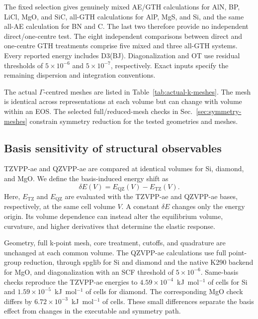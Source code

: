 \documentclass[10pt,a4paper]{article}
\begin{document}
The fixed selection gives genuinely mixed AE/GTH calculations for AlN, BP, LiCl, MgO, and SiC, all-GTH calculations for AlP, MgS, and Si, and the same all-AE calculation for BN and C. The last two therefore provide no independent direct/one-centre test. The eight independent comparisons between direct and one-centre GTH treatments comprise five mixed and three all-GTH systems. Every reported energy includes D3(BJ). Diagonalization and OT use residual thresholds of $5\times10^{-6}$ and $5\times10^{-7}$, respectively. Exact inputs specify the remaining dispersion and integration conventions.

The actual $\Gamma$-centred meshes are listed in Table~\ref{tab:actual-k-meshes}. The mesh is identical across representations at each volume but can change with volume within an EOS. The selected full/reduced-mesh checks in Sec.~\ref{sec:symmetry-meshes} constrain symmetry reduction for the tested geometries and meshes.


\subsection{Basis sensitivity of structural observables}
\label{sec:solid-basis}

TZVPP-ae and QZVPP-ae are compared at identical volumes for Si, diamond, and MgO. We define the basis-induced energy shift as
\begin{equation}
 \delta E(V)=E_{\mathrm{QZ}}(V)-E_{\mathrm{TZ}}(V).
\end{equation}
Here, $E_{\mathrm{TZ}}$ and $E_{\mathrm{QZ}}$ are evaluated with the TZVPP-ae and QZVPP-ae bases, respectively, at the same cell volume $V$.
A constant $\delta E$ changes only the energy origin. Its volume dependence can instead alter the equilibrium volume, curvature, and higher derivatives that determine the elastic response.

Geometry, full k-point mesh, core treatment, cutoffs, and quadrature are unchanged at each common volume. The QZVPP-ae calculations use full point-group reduction, through spglib for Si and diamond and the native K290 backend for MgO, and diagonalization with an SCF threshold of $5\times10^{-6}$. Same-basis checks reproduce the TZVPP-ae energies to $4.59\times10^{-4}$~kJ~mol$^{-1}$ of cells for Si and $1.59\times10^{-5}$~kJ~mol$^{-1}$ of cells for diamond. The corresponding MgO check differs by $6.72\times10^{-3}$~kJ~mol$^{-1}$ of cells. These small differences separate the basis effect from changes in the executable and symmetry path.
\end{document}
